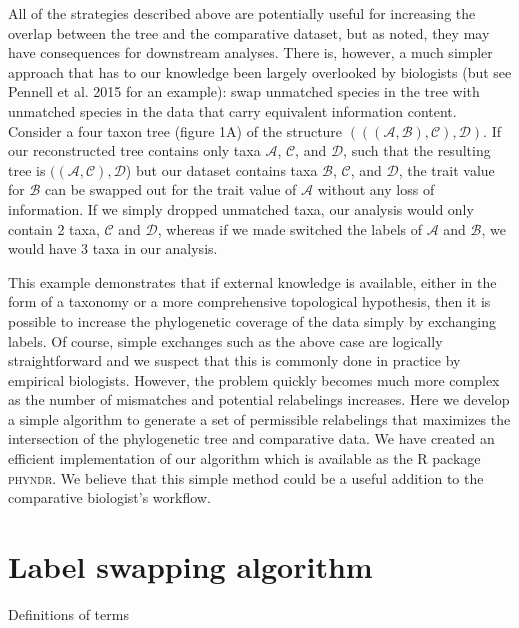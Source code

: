 \documentclass[a4paper,11pt]{article}
\begin{document}

All of the strategies described above are potentially useful for increasing the overlap between the tree and the comparative dataset, but as noted, they may have consequences for downstream analyses. There is, however, a much simpler approach that has to our knowledge been largely overlooked by biologists (but see Pennell et al. 2015 for an example): swap unmatched species in the tree with unmatched species in the data that carry equivalent information content. Consider a four taxon tree (figure 1A) of the structure $(((\mathcal{A},\mathcal{B}),\mathcal{C}),\mathcal{D})$. If our reconstructed tree contains only taxa $\mathcal{A}$, $\mathcal{C}$, and $\mathcal{D}$, such that the resulting tree is $((\mathcal{A},\mathcal{C}),\mathcal{D}$) but our dataset contains taxa $\mathcal{B}$, $\mathcal{C}$, and $\mathcal{D}$, the trait value for $\mathcal{B}$ can be swapped out for the trait value of $\mathcal{A}$ without any loss of information. If we simply dropped unmatched taxa, our analysis would only contain 2 taxa, $\mathcal{C}$ and $\mathcal{D}$, whereas if we made switched the labels of $\mathcal{A}$ and $\mathcal{B}$, we would have 3 taxa in our analysis.

This example demonstrates that if external knowledge is available, either in the form of a taxonomy or  a more comprehensive topological hypothesis, then it is possible to increase the phylogenetic coverage of the data simply by exchanging labels. Of course, simple exchanges such as the above case are logically straightforward and we suspect that this is commonly done in practice by empirical biologists. However, the problem quickly becomes much more complex as the number of mismatches and potential relabelings increases. Here we develop a simple algorithm to generate a set of permissible relabelings that maximizes the intersection of the phylogenetic tree and comparative data. We have created an efficient implementation of our algorithm which is available as the R package \textsc{phyndr}. We believe that this simple method could be a useful addition to the comparative biologist's workflow.

\section{Label swapping algorithm}

Definitions of terms
\end{document}
